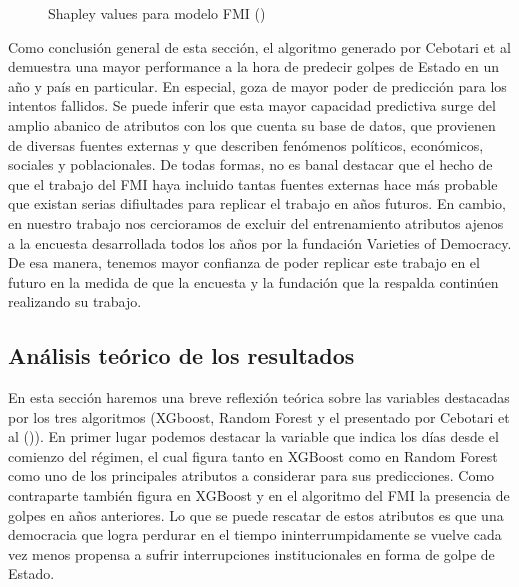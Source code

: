 \documentclass{article}
\begin{document}
\begin{figure}[H]
 \centering
 \caption{Shapley values para modelo FMI (\cite{Ceb24}) \label{fig:shapley_cebotari}}
\end{figure}

Como conclusión general de esta sección, el algoritmo generado por Cebotari et al demuestra una mayor 
performance a la hora de predecir golpes de Estado en un año y país en particular. En especial, goza
de mayor poder de predicción para los intentos fallidos. Se puede inferir que esta mayor capacidad
predictiva surge del amplio abanico de atributos con los que cuenta su base de datos, que provienen de
diversas fuentes externas y que describen fenómenos políticos, económicos, sociales y poblacionales. De
todas formas, no es banal destacar que el hecho de que el trabajo del FMI haya incluido tantas fuentes
externas hace más probable que existan serias difiultades para replicar el trabajo en años futuros. En 
cambio, en nuestro trabajo nos cercioramos de excluir del entrenamiento atributos ajenos a la encuesta
desarrollada todos los años por la fundación Varieties of Democracy. De esa manera, tenemos mayor 
confianza de poder replicar este trabajo en el futuro en la medida de que la encuesta y la fundación 
que la respalda continúen realizando su trabajo.

\subsection{Análisis teórico de los resultados}

En esta sección haremos una breve reflexión teórica sobre las variables destacadas por los tres 
algoritmos (XGboost, Random Forest y el presentado por Cebotari et al (\citeyear{Ceb24})). En primer lugar
podemos destacar la variable que indica los días desde el comienzo del régimen, el cual figura tanto en 
XGBoost como en Random Forest como uno de los principales atributos a considerar para sus predicciones.
Como contraparte también figura en XGBoost y en el algoritmo del FMI la presencia de golpes en años
anteriores. Lo que se puede rescatar de estos atributos es que una democracia que logra perdurar en el
tiempo ininterrumpidamente se vuelve cada vez menos propensa a sufrir interrupciones institucionales en
forma de golpe de Estado.
\end{document}

